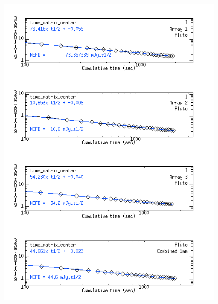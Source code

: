 \begin{figure}[htpb]
\begin{center}
\includegraphics[clip, angle=0, scale=0.4]{Figures/Pluto_8_sigma_vs_time_matrix_center.png}

\end{center}
\end{figure}
